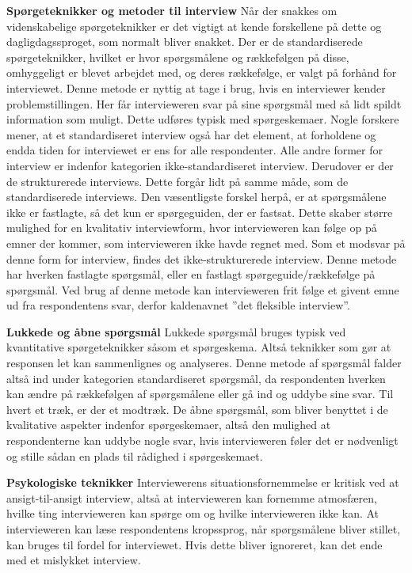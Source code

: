 \textbf{Spørgeteknikker og metoder til interview}\newline
Når der snakkes om videnskabelige spørgeteknikker er det vigtigt at kende forskellene på dette og dagligdagssproget, som normalt bliver snakket. Der er de standardiserede spørgeteknikker, hvilket er hvor spørgsmålene og rækkefølgen på disse, omhyggeligt er blevet arbejdet med, og deres rækkefølge, er valgt på forhånd for interviewet. Denne metode er nyttig at tage i brug, hvis en interviewer kender problemstillingen. Her får intervieweren svar på sine spørgsmål med så lidt spildt information som muligt. Dette udføres typisk med spørgeskemaer. Nogle forskere mener, at et standardiseret interview også har det element, at forholdene og endda tiden for interviewet er ens for alle respondenter. Alle andre former for interview er indenfor kategorien ikke-standardiseret interview.
Derudover er der de strukturerede interviews. Dette forgår lidt på samme måde, som de standardiserede interviews. Den væsentligste forskel herpå, er at spørgsmålene ikke er fastlagte, så det kun er spørgeguiden, der er fastsat. Dette skaber større mulighed for en kvalitativ interviewform, hvor intervieweren kan følge op på emner der kommer, som intervieweren ikke havde regnet med. Som et modsvar på denne form for interview, findes det ikke-strukturerede interview. Denne metode har hverken fastlagte spørgsmål, eller en fastlagt spørgeguide/rækkefølge på spørgsmål. Ved brug af denne metode kan intervieweren frit følge et givent emne ud fra respondentens svar, derfor kaldenavnet  ”det fleksible interview”.\newline
 
\textbf{Lukkede og åbne spørgsmål}\newline
Lukkede spørgsmål bruges typisk ved kvantitative spørgeteknikker såsom et spørgeskema. Altså teknikker som gør at responsen let kan sammenlignes og analyseres. Denne metode af spørgsmål falder altså ind under kategorien standardiseret spørgsmål, da respondenten hverken kan ændre på rækkefølgen af spørgsmålene eller gå ind og uddybe sine svar. 
Til hvert et træk, er der et modtræk. De åbne spørgsmål, som bliver benyttet i de kvalitative aspekter indenfor spørgeskemaer, altså den mulighed at respondenterne kan uddybe nogle svar, hvis intervieweren føler det er nødvenligt og stille sådan en plads til rådighed i spørgeskemaet.\newline

\textbf{Psykologiske teknikker}\newline
Interviewerens situationsfornemmelse er kritisk ved at ansigt-til-ansigt interview, altså at intervieweren kan fornemme atmosfæren, hvilke ting intervieweren kan spørge om og hvilke intervieweren ikke kan. At intervieweren kan læse respondentens kropssprog, når spørgsmålene bliver stillet, kan bruges til fordel for interviewet. Hvis dette bliver ignoreret, kan det ende med et mislykket interview.\newline

